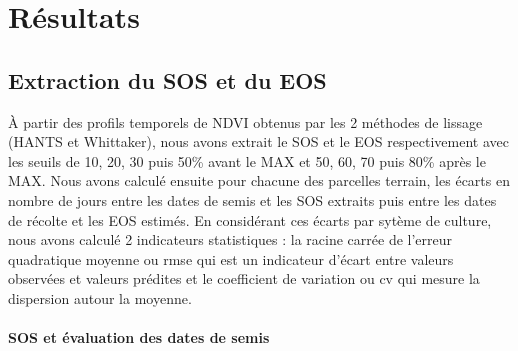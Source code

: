 \section{Résultats}

\subsection{Extraction du SOS et du EOS}

\`A partir des profils temporels de NDVI obtenus par les 2 méthodes de lissage (HANTS et Whittaker), nous avons extrait le SOS et le EOS respectivement avec les seuils de 10, 20, 30 puis 50\% avant le MAX et 50, 60, 70 puis 80\% après le MAX. Nous avons calculé ensuite pour chacune des parcelles terrain, les écarts en nombre de jours entre les dates de semis et les SOS extraits puis entre les dates de récolte et les EOS estimés. En considérant ces écarts par sytème de culture, nous avons calculé 2 indicateurs statistiques : la racine carrée de l'erreur quadratique moyenne ou \acrshort{rmse} qui est un indicateur d'écart entre valeurs observées et valeurs prédites et le coefficient de variation ou \acrshort{cv} qui mesure la dispersion autour la moyenne. 

\paragraph{SOS et évaluation des dates de semis}

